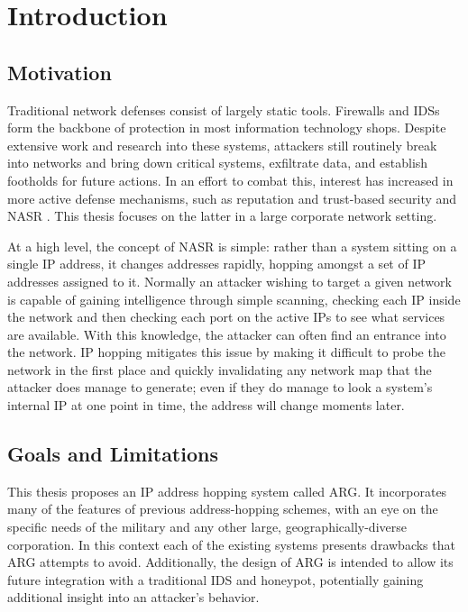 \chapter{Introduction}
\label{chp:introduction}

\section{Motivation}
\par Traditional network defenses consist of largely static tools. Firewalls and \acp{IDS} form the backbone of protection in most information technology shops. Despite extensive work and research into these systems, attackers still routinely break into networks and bring down critical systems, exfiltrate data, and establish footholds for future actions. In an effort to combat this, interest has increased in more active defense mechanisms, such as reputation and trust-based security \cite{Untrustworthiness} and \ac{NASR} \cite{APOD, NAH}. This thesis focuses on the latter in a large corporate network setting.

\par At a high level, the concept of \ac{NASR} is simple: rather than a system sitting on a single \ac{IP} address, it changes addresses rapidly, hopping amongst a set of \ac{IP} addresses assigned to it. Normally an attacker wishing to target a given network is capable of gaining intelligence through simple scanning, checking each \ac{IP} inside the network and then checking each port on the active \acp{IP} to see what services are available. With this knowledge, the attacker can often find an entrance into the network. \ac{IP} hopping mitigates this issue by making it difficult to probe the network in the first place and quickly invalidating any network map that the attacker does manage to generate; even if they do manage to look a system's internal \ac{IP} at one point in time, the address will change moments later.

\section{Goals and Limitations}
\par This thesis proposes an \ac{IP} address hopping system called \ac{ARG}. It incorporates many of the features of previous address-hopping schemes, with an eye on the specific needs of the military and any other large, geographically-diverse corporation. In this context each of the existing systems presents drawbacks that \ac{ARG} attempts to avoid. Additionally, the design of ARG is intended to allow its future integration with a traditional \ac{IDS} and honeypot, potentially gaining additional insight into an attacker's behavior.

